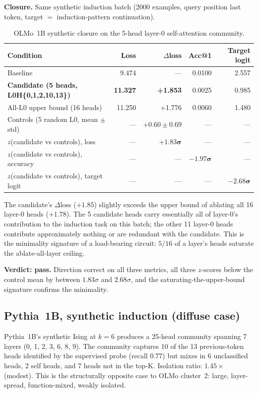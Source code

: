 \documentclass[11pt]{article}
\begin{document}
\textbf{Closure.} Same synthetic induction batch (2000 examples, query
position last token, target $=$ induction-pattern continuation).

\begin{table}[h]
\centering
\small
\begin{tabularx}{\textwidth}{lrrrr}
\toprule
Condition & Loss & $\Delta$loss & Acc@1 & Target logit \\
\midrule
Baseline & 9.474 & --- & 0.0100 & 2.557 \\
\textbf{Candidate (5 heads, L0H\{0,1,2,10,13\})} & \textbf{11.327} & \textbf{+1.853} & 0.0025 & 0.985 \\
All-L0 upper bound (16 heads) & 11.250 & +1.776 & 0.0060 & 1.480 \\
Controls (5 random L0, mean $\pm$ std) & --- & $+0.60 \pm 0.69$ & --- & --- \\
$z$(candidate vs controls), loss & --- & $\mathbf{+1.83\sigma}$ & --- & --- \\
$z$(candidate vs controls), accuracy & --- & --- & $\mathbf{-1.97\sigma}$ & --- \\
$z$(candidate vs controls), target logit & --- & --- & --- & $\mathbf{-2.68\sigma}$ \\
\bottomrule
\end{tabularx}
\caption{OLMo~1B synthetic closure on the 5-head layer-0 self-attention
community.}
\label{tab:olmo-synth}
\end{table}

The candidate's $\Delta$loss ($+1.85$) slightly exceeds the upper bound of
ablating all 16 layer-0 heads ($+1.78$). The 5 candidate heads carry
essentially all of layer-0's contribution to the induction task on this
batch; the other 11 layer-0 heads contribute approximately nothing or are
redundant with the candidate. This is the minimality signature of a
load-bearing circuit: $5/16$ of a layer's heads saturate the
ablate-all-layer ceiling.

\textbf{Verdict: pass.} Direction correct on all three metrics, all three
$z$-scores below the control mean by between $1.83\sigma$ and
$2.68\sigma$, and the saturating-the-upper-bound signature confirms the
minimality.

\subsection{Pythia~1B, synthetic induction (diffuse case)}
\label{sec:pythia-synthetic}

Pythia~1B's synthetic Ising at $k=6$ produces a 25-head community spanning
7 layers (0, 1, 2, 3, 6, 8, 9). The community captures 10 of the 13
previous-token heads identified by the supervised probe (recall $0.77$) but
mixes in 6 unclassified heads, 2 self heads, and 7 heads not in the
top-K. Isolation ratio: $1.45\times$ (modest). This is the structurally
opposite case to OLMo cluster~2: large, layer-spread, function-mixed,
weakly isolated.
\end{document}
